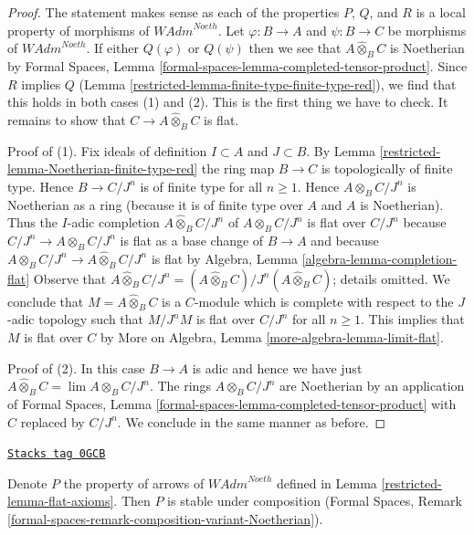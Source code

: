 \begin{proof}

The statement makes sense as each of the properties $P$, $Q$, and $R$
is a local property of morphisms of $\textit{WAdm}^{Noeth}$.
Let $\varphi : B \to A$ and $\psi : B \to C$ be morphisms of
$\textit{WAdm}^{Noeth}$. If either $Q(\varphi)$ or $Q(\psi)$
then we see that $A \widehat{\otimes}_B C$ is Noetherian by
Formal Spaces, Lemma \ref{formal-spaces-lemma-completed-tensor-product}.
Since $R$ implies $Q$ (Lemma \ref{restricted-lemma-finite-type-finite-type-red}),
we find that this holds in both cases (1) and (2).
This is the first thing we have to check. It remains to show
that $C \to A \widehat{\otimes}_B C$ is flat.

\medskip\noindent
Proof of (1). Fix ideals of definition $I \subset A$ and $J \subset B$.
By Lemma \ref{restricted-lemma-Noetherian-finite-type-red} the ring map
$B \to C$ is topologically of finite type. Hence
$B \to C/J^n$ is of finite type for all $n \geq 1$.
Hence $A \otimes_B C/J^n$ is Noetherian as a ring
(because it is of finite type over $A$ and $A$ is Noetherian).
Thus the $I$-adic completion $A \widehat{\otimes}_B C/J^n$
of $A \otimes_B C/J^n$ is flat over $C/J^n$ because
$C/J^n \to A \otimes_B C/J^n$ is flat as a base change of
$B \to A$ and because
$A \otimes_B C/J^n \to A \widehat{\otimes}_B C/J^n$ is flat by
Algebra, Lemma \ref{algebra-lemma-completion-flat}
Observe that $A \widehat{\otimes}_B C/J^n =
(A \widehat{\otimes}_B C)/J^n(A \widehat{\otimes}_B C)$; details omitted.
We conclude that $M = A \widehat{\otimes}_B C$ is a $C$-module
which is complete with respect to the $J$-adic topology
such that $M/J^nM$ is flat over $C/J^n$ for all $n \geq 1$.
This implies that $M$ is flat over $C$ by
More on Algebra, Lemma \ref{more-algebra-lemma-limit-flat}.

\medskip\noindent
Proof of (2). In this case $B \to A$ is adic and hence we have just
$A \widehat{\otimes}_B C = \lim A \otimes_B C/J^n$.
The rings $A \otimes_B C/J^n$ are Noetherian by an application of
Formal Spaces, Lemma \ref{formal-spaces-lemma-completed-tensor-product}
with $C$ replaced by $C/J^n$.
We conclude in the same manner as before.
\end{proof}

\begin{lemma}
\label{restricted-lemma-composition-flat-continuous}
\href{https://stacks.math.columbia.edu/tag/0GCB}{\texttt{Stacks tag 0GCB}}

Denote $P$ the property of arrows of $\textit{WAdm}^{Noeth}$
defined in Lemma \ref{restricted-lemma-flat-axioms}.
Then $P$ is stable under composition (Formal Spaces, Remark
\ref{formal-spaces-remark-composition-variant-Noetherian}).
\end{lemma}

